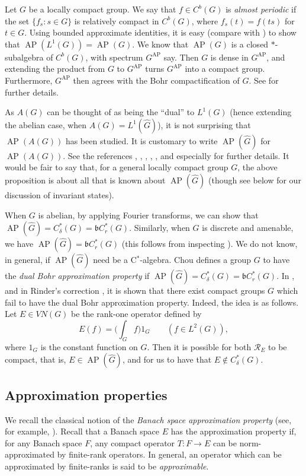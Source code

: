 \documentclass[twoside,a4paper]{article}
\theoremstyle{definition}
\theoremstyle{remark}
\newcommand{\ap}{{\operatorname{AP}}}
\newcommand{\mc}{\mathcal}
\newcommand{\mf}{\mathfrak}
\begin{document}
Let $G$ be a locally compact group.  We say that $f\in C^b(G)$ is \emph{almost periodic}
if the set $\{ f_s : s\in G \}$ is relatively compact in $C^b(G)$, where $f_s(t) = f(ts)$ for
$t\in G$.  Using bounded approximate identities, it is easy (compare with \cite{ulger}) to
show that $\ap(L^1(G)) = \ap(G)$.  We know that $\ap(G)$ is a closed $*$-subalgebra of
$C^b(G)$, with spectrum $G^\ap$ say.  Then $G$ is dense in $G^\ap$, and extending the product
from $G$ to $G^\ap$ turns $G^\ap$ into a compact group.  Furthermore, $G^\ap$ then agrees with
the Bohr compactification of $G$.  See \cite{BJM} for further details.

As $A(G)$ can be thought of as being the ``dual'' to $L^1(G)$ (hence extending the abelian case,
when $A(G) = L^1(\hat G)$), it is not surprising that $\ap(A(G))$ has been studied.  It is
customary to write $\ap(\hat G)$ for $\ap(A(G))$.  See the references \cite[Section~7]{DR},
\cite{gran1}, \cite{lau}, \cite{hu}, \cite{must}, and especially \cite{chou} for further
details.  It would be fair to say that, for a general locally compact group $G$, the above
proposition is about all that is known about $\ap(\hat G)$ (though see below for our discussion
of invariant states).

When $G$ is abelian, by applying Fourier transforms, we can show that $\ap(\hat G) = C^*_\delta(G)
= \mf b C^*_r(G)$.  Similarly, when $G$ is discrete and amenable, we have $\ap(\hat G) =
\mf b C^*_r(G)$ (this follows from inspecting \cite[Proposition~2]{gran1}).  We do not know,
in general, if $\ap(\hat G)$ need be a C$^*$-algebra.  Chou defines a group $G$ to have the
\emph{dual Bohr approximation property} if $\ap(\hat G) = C^*_\delta(G) = \mf bC^*_r(G)$.
In \cite{chou}, and in Rinder's correction \cite{rindler}, it is shown that there exist
compact groups $G$ which fail to have the dual Bohr approximation property.  Indeed, the idea
is as follows.  Let $E\in VN(G)$ be the rank-one operator defined by
\[ E(f) = \Big(\int_G f \Big) 1_G \qquad (f\in L^2(G)), \]
where $1_G$ is the constant function on $G$.  Then it is possible for both
$\mc R_E$ to be compact, that is, $E\in\ap(\hat G)$, and for us to have that
$E\not\in C^*_\delta(G)$.



\subsection{Approximation properties}

We recall the classical notion of the \emph{Banach space approximation property}
(see, for example, \cite[Section~1.e]{lt}).  Recall that a Banach space $E$ has the
approximation property if, for any Banach space $F$, any compact operator $T:F\rightarrow E$
can be norm-approximated by finite-rank operators.  In general, an operator which can be
approximated by finite-ranks is said to be \emph{approximable}.
\end{document}
